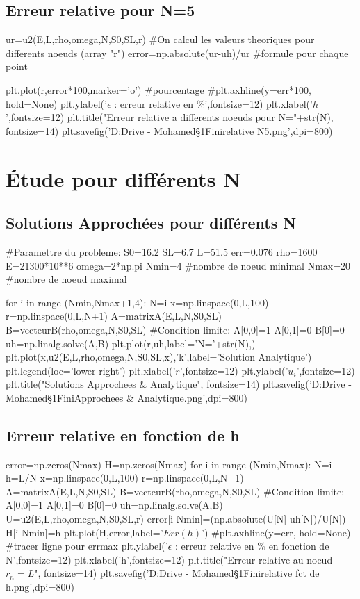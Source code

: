 \documentclass[a4paper,10pt]{report} %
\begin{document}
\subsection{Erreur relative pour N=5}
\begin{python}
ur=u2(E,L,rho,omega,N,S0,SL,r) #On calcul les valeurs theoriques pour differents noeuds (array "r")
error=np.absolute(ur-uh)/ur #formule pour chaque point

plt.plot(r,error*100,marker='o') #pourcentage
#plt.axhline(y=err*100, hold=None)
plt.ylabel('$\epsilon$ : erreur relative en $\%$',fontsize=12)
plt.xlabel('$h$',fontsize=12)
plt.title("Erreur relative a differents noeuds pour N="+str(N), fontsize=14)
plt.savefig('D:\Google Drive - Mohamed\Cours\S1\Element Fini\Erreur relative N5.png',dpi=800) 
\end{python}
\section{Étude pour différents N}
\subsection{Solutions Approchées pour différents N}
\begin{python}
#Paramettre du probleme:
S0=16.2
SL=6.7
L=51.5
err=0.076
rho=1600
E=21300*10**6
omega=2*np.pi
Nmin=4 #nombre de noeud minimal
Nmax=20 #nombre de noeud maximal

for i in range (Nmin,Nmax+1,4):
    N=i
    x=np.linspace(0,L,100)
    r=np.linspace(0,L,N+1)
    A=matrixA(E,L,N,S0,SL)
    B=vecteurB(rho,omega,N,S0,SL)
    #Condition limite:
    A[0,0]=1
    A[0,1]=0
    B[0]=0
    uh=np.linalg.solve(A,B)
    plt.plot(r,uh,label='N='+str(N),)
plt.plot(x,u2(E,L,rho,omega,N,S0,SL,x),'k',label='Solution Analytique')
plt.legend(loc='lower right')
plt.xlabel('$r$',fontsize=12)
plt.ylabel('$u_{i}$',fontsize=12)
plt.title("Solutions Approchees & Analytique", fontsize=14)
plt.savefig('D:\Google Drive - Mohamed\Cours\S1\Element Fini\Solutions Approchees & Analytique.png',dpi=800)
\end{python}
\subsection{Erreur relative en fonction de h}

\begin{python}
error=np.zeros(Nmax)
H=np.zeros(Nmax)
for i in range (Nmin,Nmax):
    N=i
    h=L/N
    x=np.linspace(0,L,100)
    r=np.linspace(0,L,N+1)
    A=matrixA(E,L,N,S0,SL)
    B=vecteurB(rho,omega,N,S0,SL)
    #Condition limite:
    A[0,0]=1
    A[0,1]=0
    B[0]=0
    uh=np.linalg.solve(A,B)
    U=u2(E,L,rho,omega,N,S0,SL,r)
    error[i-Nmin]=(np.absolute(U[N]-uh[N])/U[N])
    H[i-Nmin]=h
plt.plot(H,error,label='$Err(h)$')
#plt.axhline(y=err, hold=None) #tracer ligne pour errmax
plt.ylabel('$\epsilon$ : erreur relative en $\%$ en fonction de N',fontsize=12)
plt.xlabel('h',fontsize=12)
plt.title("Erreur relative au noeud $r_{n}=L$", fontsize=14)
plt.savefig('D:\Google Drive - Mohamed\Cours\S1\Element Fini\Erreur relative fct de h.png',dpi=800) 
\end{python}
\end{document}
